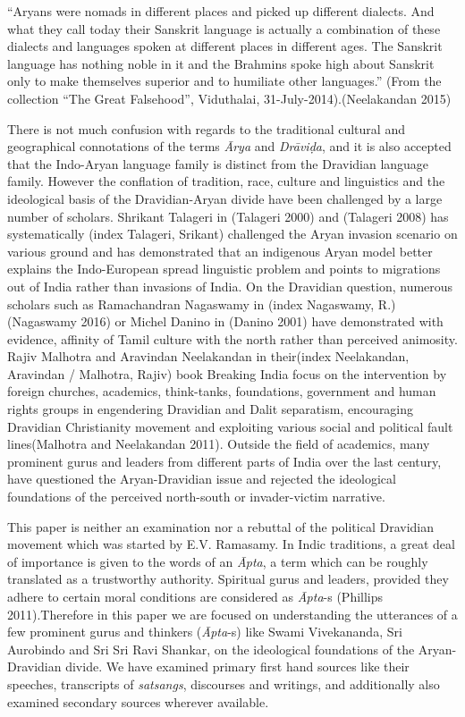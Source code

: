 \begin{myquote}
“Aryans were nomads in different places and picked up different dialects. And what they call today their Sanskrit language is actually a combination of these dialects and languages spoken at different places in different ages. The Sanskrit language has nothing noble in it and the Brahmins spoke high about Sanskrit only to make themselves superior and to humiliate other languages.” (From the collection “The Great Falsehood”, Viduthalai, 31-July-2014).(Neelakandan 2015)
\end{myquote}

There is not much confusion with regards to the traditional cultural and geographical connotations of the terms \textit{Ārya} and \textit{Drāviḍa}, and it is also accepted that the Indo-Aryan language family is distinct from the Dravidian language family. However the conflation of tradition, race, culture and linguistics and the ideological basis of the Dravidian-Aryan divide have been challenged by a large number of scholars. Shrikant Talageri in (Talageri 2000) and (Talageri 2008) has systematically (index Talageri, Srikant) challenged the Aryan invasion scenario on various ground and has demonstrated that an indigenous Aryan model better explains the Indo-European spread linguistic problem and points to migrations out of India rather than invasions of India. On the Dravidian question, numerous scholars such as Ramachandran Nagaswamy in (index Nagaswamy, R.) (Nagaswamy 2016) or Michel Danino in (Danino 2001) have demonstrated with evidence, affinity of Tamil culture with the north rather than perceived animosity. Rajiv Malhotra and Aravindan Neelakandan in their(index Neelakandan, Aravindan / Malhotra, Rajiv) book Breaking India focus on the intervention by foreign churches, academics, think-tanks, foundations, government and human rights groups in engendering Dravidian and Dalit separatism, encouraging Dravidian Christianity movement and exploiting various social and political fault lines(Malhotra and Neelakandan 2011). Outside the field of academics, many prominent gurus and leaders from different parts of India over the last century, have questioned the Aryan-Dravidian issue and rejected the ideological foundations of the perceived north-south or invader-victim narrative.

This paper is neither an examination nor a rebuttal of the political Dravidian movement which was started by E.V. Ramasamy. In Indic traditions, a great deal of importance is given to the words of an \textit{Āpta}, a term which can be roughly translated as a trustworthy authority. Spiritual gurus and leaders, provided they adhere to certain moral conditions are considered as \textit{Āpta}-s (Phillips 2011).Therefore in this paper we are focused on understanding the utterances of a few prominent gurus and thinkers (\textit{Āpta}-s) like Swami Vivekananda, Sri Aurobindo and Sri Sri Ravi Shankar, on the ideological foundations of the Aryan-Dravidian divide. We have examined primary first hand sources like their speeches, transcripts of \textit{satsangs}, discourses and writings, and additionally also examined secondary sources wherever available.


